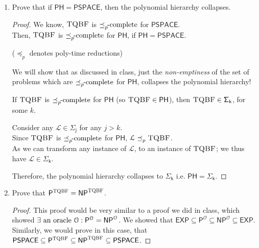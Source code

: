 \documentclass[usletter]{article}
\newcommand {\langset}[1]      {\ensuremath{\mathcal{#1}}}
\newcommand {\namedlangset}[1] {\ensuremath{\textnormal{\textsc{#1}}}}
\newcommand {\family}[1]       {\ensuremath{\mathsf{#1}}}
\newcommand {\reduce}[2]    {\ensuremath{\preceq_{#1}^{#2}}}
\newcommand {\complete}[2]  {\ensuremath{\reduce{#1}{#2}     %
                                         \hspace*{-4pt}\textnormal{-complete}}}
\newcommand{\ie}{\textnormal{i.e. }}
\newcommand {\langL}          {\langset{L}}
\begin{document}
\begin{enumerate}
  \item Prove that if $\family{PH} = \family{PSPACE}$,
        then the polynomial hierarchy collapses.
  \begin{proof}
    We know, \namedlangset{TQBF} is \complete{p}{} for \family{PSPACE}. \\
    Then, \namedlangset{TQBF} is \complete{p}{} for \family{PH},
    if $\family{PH} = \family{PSPACE}$.

    (\reduce{p}{} denotes poly-time reductions)

    We will show that as discussed in class, just the \textit{non-emptiness} of
    the set of problems which are \complete{p}{} for \family{PH}, collapses the
    polynomial hierarchy!

    If \namedlangset{TQBF} is \complete{p}{} for \family{PH}
    (so $\namedlangset{TQBF} \in \family{PH}$),
    then $\namedlangset{TQBF} \in \family{\Sigma_k}$, for some $k$.

    Consider any $\langL \in \family{\Sigma_j}$ for any $j > k$. \\
    Since \namedlangset{TQBF} is \complete{p}{} for \family{PH},
    $\langL \reduce{p}{} \namedlangset{TQBF}$. \\
    As we can transform any instance of \langL,
    to an instance of \namedlangset{TQBF};
    we thus have $\langL \in \family{\Sigma_k}$.

    Therefore, the polynomial hierarchy collapses to $\family{\Sigma_k}$
    \ie $\family{PH} = \family{\Sigma_k}$.
  \end{proof}

  \item Prove that
        $\family{P}^\namedlangset{TQBF} = \family{NP}^\namedlangset{TQBF}$.
  \begin{proof}
    This proof would be very similar to a proof we did in class, which showed
    $\exists \textnormal{ an oracle } \langset{O}:
      \family{P}^\langset{O} = \family{NP}^\langset{O}$.
    We showed that $\family{EXP} \subseteq \family{P}^\langset{O}
                                 \subseteq \family{NP}^\langset{O}
                                 \subseteq \family{EXP}$.
    Similarly, we would prove in this case, that
    $\family{PSPACE} \subseteq \family{P}^\namedlangset{TQBF}
                     \subseteq \family{NP}^\namedlangset{TQBF}
                     \subseteq \family{PSPACE}$.


\end{proof}
\end{enumerate}
\end{document}
